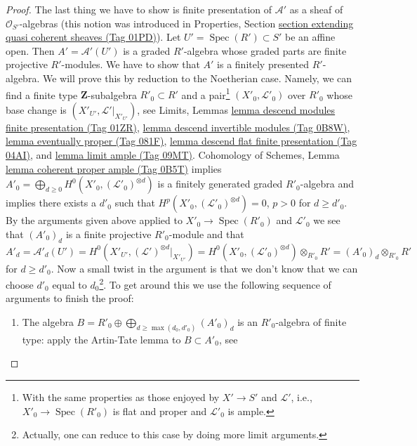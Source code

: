 \documentclass{amsart}
\theoremstyle{plain}
\theoremstyle{definition}
\theoremstyle{remark}
\numberwithin{equation}{subsection}
\def\Spec{\mathop{\mathrm{Spec}}}
\begin{document}
\begin{proof}
\medskip\noindent
The last thing we have to show is finite presentation of
$\mathcal{A}'$ as a sheaf of $\mathcal{O}_{S'}$-algebras
(this notion was introduced in Properties, Section
\href{https://stacks.math.columbia.edu/tag/01PD}{section extending quasi coherent sheaves (Tag 01PD)}).
Let $U' = \Spec(R') \subset S'$ be an affine open.
Then $A' = \mathcal{A}'(U')$ is a graded $R'$-algebra
whose graded parts are finite projective $R'$-modules.
We have to show that $A'$ is a finitely presented $R'$-algebra.
We will prove this by reduction to the Noetherian case.
Namely, we can find a finite type $\mathbf{Z}$-subalgebra
$R'_0 \subset R'$ and a pair\footnote{With the same properties
as those enjoyed by $X' \to S'$ and $\mathcal{L}'$, i.e.,
$X'_0 \to \Spec(R'_0)$ is flat and proper and $\mathcal{L}'_0$
is ample.} $(X'_0, \mathcal{L}'_0)$ over $R'_0$
whose base change is $(X'_{U'}, \mathcal{L}'|_{X'_{U'}})$, see
Limits, Lemmas
\href{https://stacks.math.columbia.edu/tag/01ZR}{lemma descend modules finite presentation (Tag 01ZR)},
\href{https://stacks.math.columbia.edu/tag/0B8W}{lemma descend invertible modules (Tag 0B8W)},
\href{https://stacks.math.columbia.edu/tag/081F}{lemma eventually proper (Tag 081F)},
\href{https://stacks.math.columbia.edu/tag/04AI}{lemma descend flat finite presentation (Tag 04AI)}, and
\href{https://stacks.math.columbia.edu/tag/09MT}{lemma limit ample (Tag 09MT)}.
Cohomology of Schemes, Lemma \href{https://stacks.math.columbia.edu/tag/0B5T}{lemma coherent proper ample (Tag 0B5T)}
implies
$A'_0 = \bigoplus_{d \geq 0} H^0(X'_0, (\mathcal{L}'_0)^{\otimes d})$
is a finitely generated graded $R'_0$-algebra and implies
there exists a $d'_0$ such that
$H^p(X'_0, (\mathcal{L}'_0)^{\otimes d}) = 0$, $p > 0$ for $d \geq d'_0$.
By the arguments given above applied to $X'_0 \to \Spec(R'_0)$ and
$\mathcal{L}'_0$ we see that $(A'_0)_d$ is a finite projective $R'_0$-module
and that
$$
A'_d = \mathcal{A}'_d(U') =
H^0(X'_{U'}, (\mathcal{L}')^{\otimes d}|_{X'_{U'}}) =
H^0(X'_0, (\mathcal{L}'_0)^{\otimes d}) \otimes_{R'_0} R' =
(A'_0)_d \otimes_{R'_0} R'
$$
for $d \geq d'_0$. Now a small twist in the argument is that we
don't know that we can choose $d'_0$ equal to $d_0$\footnote{Actually,
one can reduce to this case by doing more limit arguments.}. To
get around this we use the following sequence of arguments to finish
the proof:
\begin{enumerate}
\item[(a)] The algebra
$B = R'_0 \oplus \bigoplus_{d \geq \max(d_0, d'_0)} (A'_0)_d$
is an $R'_0$-algebra of finite type: apply
the Artin-Tate lemma to $B \subset A'_0$, see

\end{enumerate}
\end{proof}
\end{document}
